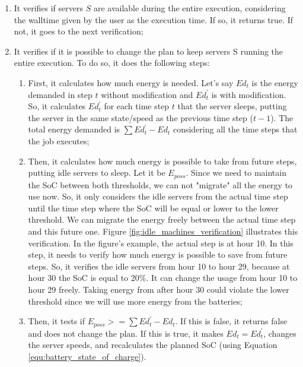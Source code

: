 \begin{enumerate}
    \item It verifies if servers $S$ are available during the entire execution, considering the walltime given by the user as the execution time. If so, it returns true. If not, it goes to the next verification;
    \item It verifies if it is possible to change the plan to keep servers S running the entire execution. To do so, it does the following steps:
    \begin{enumerate}
        \item First, it calculates how much energy is needed. Let's say $Ed_t$ is the energy demanded in step $t$ without modification and $Ed_t^{'}$ is with modification. So, it calculates $Ed_t^{'}$ for each time step $t$ that the server sleeps, putting the server in the same state/speed as the previous time step ($t-1$). The total energy demanded is $\sum Ed_t^{'} - Ed_t$ considering all the time steps that the job executes;
        \item Then, it calculates how much energy is possible to take from future steps, putting idle servers to sleep. Let it be $E_{poss}$. Since we need to maintain the SoC between both thresholds, we can not "migrate" all the energy to use now. So, it only considers the idle servers from the actual time step until the time step where the SoC will be equal or lower to the lower threshold. We can migrate the energy freely between the actual time step and this future one. Figure \ref{fig:idle_machines_verification} illustrates this verification. In the figure's example, the actual step is at hour 10. In this step, it needs to verify how much energy is possible to save from future steps. So, it verifies the idle servers from hour 10 to hour 29, because at hour 30 the SoC is equal to 20\%. It can change the usage from hour 10 to hour 29 freely. Taking energy from after hour 30 could violate the lower threshold since we will use more energy from the batteries;
        \item Then, it tests if $E_{poss} >= \sum Ed_t^{'} - Ed_t$. If this is false, it returns false and does not change the plan. If this is true, it makes $Ed_t = Ed_t^{'}$, changes the server speeds, and recalculates the planned SoC (using Equation \ref{equ:battery_state_of_charge}).
    \end{enumerate}
\end{enumerate}

